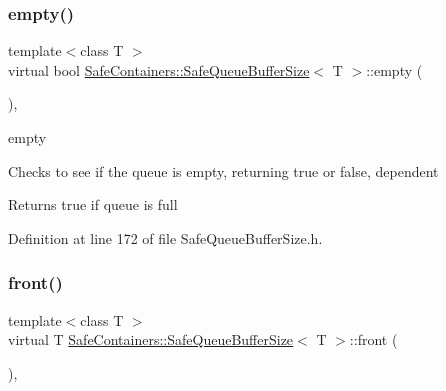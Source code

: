 \mbox{\label{classSafeContainers_1_1SafeQueueBufferSize_a7f20de3963f43b86282a33108f784831}} 
\subsubsection{\texorpdfstring{empty()}{empty()}}
{\footnotesize\ttfamily template$<$class T $>$ \\
virtual bool \mbox{\hyperlink{classSafeContainers_1_1SafeQueueBufferSize}{Safe\+Containers\+::\+Safe\+Queue\+Buffer\+Size}}$<$ T $>$\+::empty (\begin{DoxyParamCaption}{ }\end{DoxyParamCaption})\hspace{0.3cm}{\ttfamily [inline]}, {\ttfamily [virtual]}}



empty 

Checks to see if the queue is empty, returning true or false, dependent

\begin{DoxyReturn}{Returns}
true if queue is full 
\end{DoxyReturn}


Definition at line 172 of file Safe\+Queue\+Buffer\+Size.\+h.

\mbox{\label{classSafeContainers_1_1SafeQueueBufferSize_afd0c81d73603b43f6ed1a12130733cb6}} 
\subsubsection{\texorpdfstring{front()}{front()}}
{\footnotesize\ttfamily template$<$class T $>$ \\
virtual T \mbox{\hyperlink{classSafeContainers_1_1SafeQueueBufferSize}{Safe\+Containers\+::\+Safe\+Queue\+Buffer\+Size}}$<$ T $>$\+::front (\begin{DoxyParamCaption}{ }\end{DoxyParamCaption})\hspace{0.3cm}{\ttfamily [inline]}, {\ttfamily [virtual]}}



